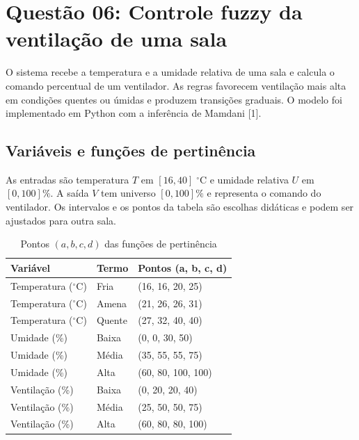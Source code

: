 \documentclass[12pt,a4paper]{article}
\begin{document}
\section{Questão 06: Controle fuzzy da ventilação de uma sala}

O sistema recebe a temperatura e a umidade relativa de uma sala e calcula o comando percentual de um ventilador. As regras favorecem ventilação mais alta em condições quentes ou úmidas e produzem transições graduais. O modelo foi implementado em Python com a inferência de Mamdani [1].

\subsection{Variáveis e funções de pertinência}

As entradas são temperatura $T$ em $[16, 40]\;^{\circ}$C e umidade relativa $U$ em $[0, 100]\%$. A saída $V$ tem universo $[0, 100]\%$ e representa o comando do ventilador. Os intervalos e os pontos da tabela são escolhas didáticas e podem ser ajustados para outra sala.

\begin{table}[htbp]
    \centering
    \caption{Pontos $(a, b, c, d)$ das funções de pertinência}
    \begin{tabular}{>{\raggedright\arraybackslash}p{4.2cm} >{\raggedright\arraybackslash}p{2.5cm} >{\raggedright\arraybackslash}p{4.2cm}}
        \toprule
        \textbf{Variável} & \textbf{Termo} & \textbf{Pontos (a, b, c, d)} \\
        \midrule
        Temperatura ($^{\circ}$C) & Fria & (16, 16, 20, 25) \\
        \addlinespace
        Temperatura ($^{\circ}$C) & Amena & (21, 26, 26, 31) \\
        \addlinespace
        Temperatura ($^{\circ}$C) & Quente & (27, 32, 40, 40) \\
        \addlinespace
        Umidade (\%) & Baixa & (0, 0, 30, 50) \\
        \addlinespace
        Umidade (\%) & Média & (35, 55, 55, 75) \\
        \addlinespace
        Umidade (\%) & Alta & (60, 80, 100, 100) \\
        \addlinespace
        Ventilação (\%) & Baixa & (0, 20, 20, 40) \\
        \addlinespace
        Ventilação (\%) & Média & (25, 50, 50, 75) \\
        \addlinespace
        Ventilação (\%) & Alta & (60, 80, 80, 100) \\
        \bottomrule
    \end{tabular}
\end{table}
\end{document}
